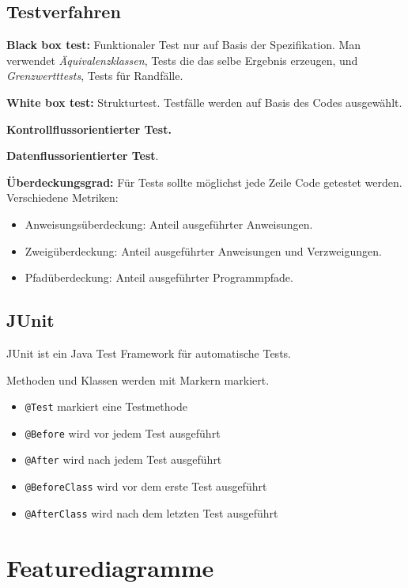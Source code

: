 \documentclass[a4paper,parskip=half*,DIV=7,fontsize=11pt]{scrartcl}
\begin{document}
\subsection{Testverfahren}

\textbf{Black box test:} Funktionaler Test nur auf Basis der Spezifikation. Man verwendet \emph{Äquivalenzklassen}, Tests die das selbe Ergebnis erzeugen, und \emph{Grenzwertttests}, Tests für Randfälle.

\textbf{White box test:} Strukturtest. Testfälle werden auf Basis des Codes ausgewählt.

\textbf{Kontrollflussorientierter Test.}

\textbf{Datenflussorientierter Test}.

\textbf{Überdeckungsgrad:} Für Tests sollte möglichst jede Zeile Code getestet werden. Verschiedene Metriken: \begin{itemize}
\item Anweisungsüberdeckung: Anteil ausgeführter Anweisungen.
\item Zweigüberdeckung: Anteil ausgeführter Anweisungen und Verzweigungen.
\item Pfadüberdeckung: Anteil ausgeführter Programmpfade.
\end{itemize}

\subsection{JUnit}

JUnit ist ein Java Test Framework für automatische Tests.

Methoden und Klassen werden mit Markern markiert.
\begin{itemize}
\item \lstinline{@Test} markiert eine Testmethode
\item \lstinline{@Before} wird vor jedem Test ausgeführt
\item \lstinline{@After} wird nach jedem Test ausgeführt
\item \lstinline{@BeforeClass} wird vor dem erste Test ausgeführt
\item \lstinline{@AfterClass} wird nach dem letzten Test ausgeführt
\end{itemize}

\section{Featurediagramme}
\end{document}
